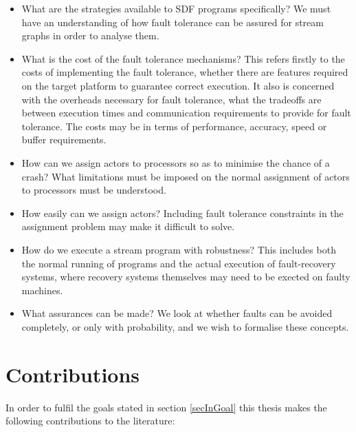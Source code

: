 \begin{itemize}
	\item What are the strategies available to SDF programs specifically?
			We must have an understanding of how fault tolerance can be assured for stream graphs in order to analyse them.
	\item What is the cost of the fault tolerance mechanisms?
			This refers firstly to the costs of implementing the fault tolerance, whether there are features required on the target platform to guarantee correct execution.
			It also is concerned with the overheads necessary for fault tolerance, what the tradeoffs are between execution times and communication requirements to provide for fault tolerance.
			The costs may be in terms of performance, accuracy, speed or buffer requirements.
	\item How can we assign actors to processors so as to minimise the chance of a crash?
			What limitations must be imposed on the normal assignment of actors to processors must be understood.
	\item How easily can we assign actors?
			Including fault tolerance constraints in the assignment problem may make it difficult to solve.
	\item How do we execute a stream program with robustness?
			This includes both the normal running of programs and the actual execution of fault-recovery systems, where recovery systems themselves may need to be exected on faulty machines.
	\item What assurances can be made?
			We look at whether faults can be avoided completely, or only with probability, and we wish to formalise these concepts.
\end{itemize}

\section{Contributions}

In order to fulfil the goals stated in section \ref{secInGoal} this thesis makes the following contributions to the literature:

